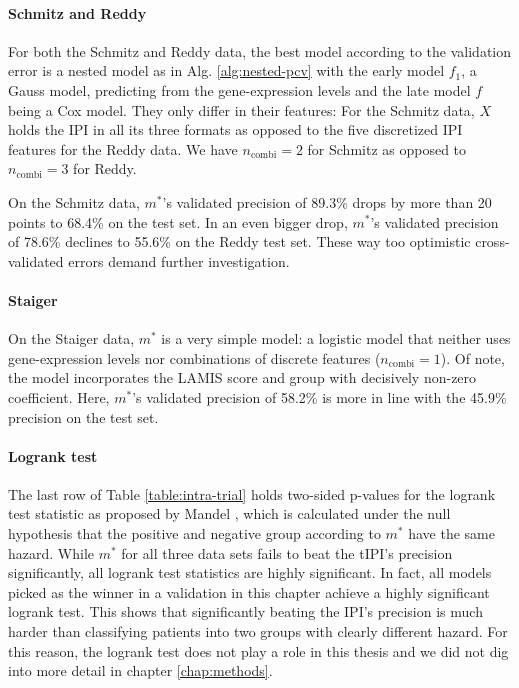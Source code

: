 \paragraph{Schmitz and Reddy}
For both the Schmitz and Reddy data, the best model according to the validation error is a nested 
model as in Alg. \ref{alg:nested-pcv} with the early model $f_1$, a Gauss model, predicting from 
the gene-expression levels and the late model $f$ being a Cox model. They only differ in their 
features: For the Schmitz data, $X$ holds the IPI in all its three formats as opposed to the five 
discretized IPI features for the Reddy data. We have $n_\text{combi} = 2$ for Schmitz as opposed to 
$n_\text{combi} = 3$ for Reddy.

On the Schmitz data, $m^*$'s validated precision of \num{89.3}\% drops by more than \num{20} points 
to \num{68.4}\% on the test set. In an even bigger drop, $m^*$'s validated precision of \num{78.6}\% 
declines to \num{55.6}\% on the Reddy test set. These way too optimistic cross-validated errors 
demand further investigation.

\paragraph{Staiger}
On the Staiger data, $m^*$ is a very simple model: a logistic model that neither uses 
gene-expression levels nor combinations of discrete features ($n_\text{combi} = 1$). Of note, the 
model incorporates the LAMIS score and group with decisively non-zero coefficient. Here, $m^*$'s 
validated precision of \num{58.2}\% is more in line with the \num{45.9}\% precision on the test set.

\paragraph{Logrank test}
The last row of Table \ref{table:intra-trial} holds two-sided p-values for the logrank test
statistic as proposed by Mandel \cite{mantel66}, which is calculated under the null hypothesis 
that the positive and negative group according to $m^*$ have the same hazard. While $m^*$ for all 
three data sets fails to beat the tIPI's precision significantly, all logrank test statistics are 
highly significant. In fact, all models picked as the winner in a validation in this chapter 
achieve a highly significant logrank test. This shows that significantly beating the 
IPI's precision is much harder than classifying patients into two groups with clearly different 
hazard. For this reason, the logrank test does not play a role in this thesis and we did not dig 
into more detail in chapter \ref{chap:methods}.


